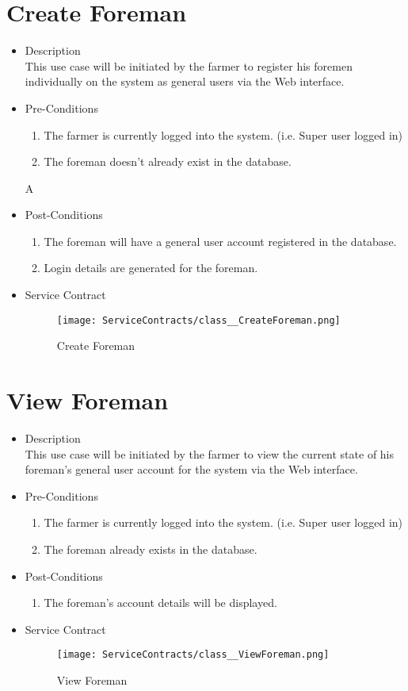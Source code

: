 \documentclass[11pt,fleqn]{book} %
\begin{document}
\section{Create Foreman}
\begin{itemize}
	\item Description\\
	This use case will be initiated by the farmer to register his foremen individually on the system as general users via the Web interface.
	\item Pre-Conditions
	\begin{enumerate}
		\item The farmer is currently logged into the system. (i.e. Super user logged in)
		\item The foreman doesn’t already exist in the database.
	\end{enumerate}A
	\item Post-Conditions
	\begin{enumerate}
		\item The foreman will have a general user account registered in the database.
		\item Login details are generated for the foreman.				
	\end{enumerate}
	\item Service Contract
	\begin{figure}
		\texttt{[image: ServiceContracts/class\_\_CreateForeman.png]}
		\caption{Create Foreman}
	\end{figure}
\end{itemize}

\section{View Foreman}
\begin{itemize}
	\item Description\\
	This use case will be initiated by the farmer to view the current state of his foreman’s general user account for the system via the Web interface.
	\item Pre-Conditions
	\begin{enumerate}
		\item The farmer is currently logged into the system. (i.e. Super user logged in)
		\item The foreman already exists in the database.					
	\end{enumerate}
	\item Post-Conditions
	\begin{enumerate}
		\item The foreman’s account details will be displayed.
	\end{enumerate}
	\item Service Contract
	\begin{figure}
		\texttt{[image: ServiceContracts/class\_\_ViewForeman.png]}
		\caption{View Foreman}
	\end{figure}
\end{itemize}
\end{document}
